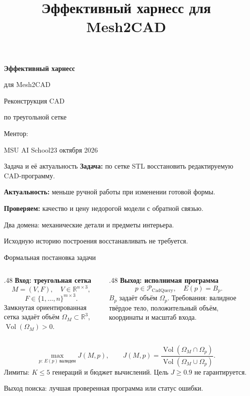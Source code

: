 \documentclass[aspectratio=169,11pt]{beamer}
\title{Эффективный харнесс для Mesh2CAD}
\author{\TeamNames}
\newcommand{\source}[1]{\par\vfill{\fontsize{7.2}{8.8}\selectfont\color{Muted}#1\par}}
\newcommand{\smalltext}{\fontsize{9.7}{12}\selectfont}
\begin{document}
\begin{frame}[plain]
\vspace{6mm}
{\fontsize{30}{34}\selectfont\bfseries Эффективный харнесс\par
для Mesh2CAD\par}
\vspace{3mm}
{\fontsize{17}{20}\selectfont Реконструкция CAD\par
по треугольной сетке\par}
\vspace{6mm}
{\fontsize{14}{17}\selectfont\TeamNames\par}
\vspace{2mm}
{\fontsize{12}{15}\selectfont Ментор: \MentorName\par}
\vfill
{\small\color{Muted}MSU AI School\hfill23 октября 2026\par}
\vspace{4mm}
\end{frame}

\begin{frame}{Задача и её актуальность}\relax
\textbf{Задача:} по сетке STL восстановить редактируемую CAD-программу.
\par\bigskip
\textbf{Актуальность:} меньше ручной работы при изменении готовой формы.
\par\bigskip
\textbf{Проверяем:} качество и цену недорогой модели с обратной связью.
\par\medskip
Два домена: механические детали и предметы интерьера.
\source{Исходную историю построения восстанавливать не требуется.}
\end{frame}

\begin{frame}{Формальная постановка задачи}\relax
\begin{columns}[T,onlytextwidth]
\begin{column}{.48\textwidth}
  \textbf{Вход: треугольная сетка}
  \[
  M=(V,F),\quad V\in\mathbb R^{n\times3},
  \]
  \[
  F\in\{1,\ldots,n\}^{m\times3}.
  \]
  {\smalltext Замкнутая ориентированная сетка задаёт
  объём $\Omega_M\subset\mathbb R^3$, $\operatorname{Vol}(\Omega_M)>0$.}
\end{column}
\begin{column}{.48\textwidth}
  \textbf{Выход: исполнимая программа}
  \[
  p\in\mathcal P_{\mathrm{CadQuery}},\quad E(p)=B_p.
  \]
  {\smalltext $B_p$ задаёт объём $\Omega_p$.
  Требования: валидное твёрдое тело, положительный объём,
  координаты и масштаб входа.}
\end{column}
\end{columns}
\par\medskip
\[
\max_{p:\,E(p)\ \text{валиден}} J(M,p),\qquad
J(M,p)=\frac{\operatorname{Vol}(\Omega_M\cap\Omega_p)}
{\operatorname{Vol}(\Omega_M\cup\Omega_p)}.
\]
{\smalltext Лимиты: $K\leq5$ генераций и бюджет вычислений.
Цель $J\geq0.9$ не гарантируется.}
\source{Выход поиска: лучшая проверенная программа или статус ошибки.}
\end{frame}
\end{document}

